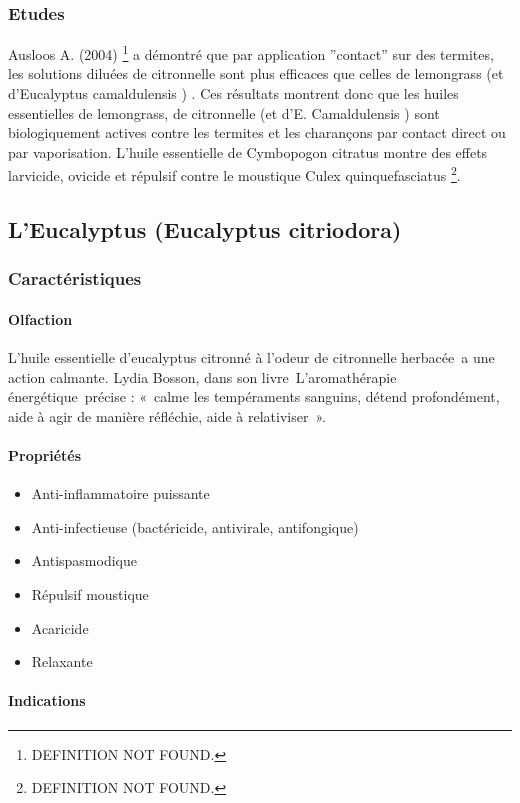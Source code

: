 \documentclass[12pt,a4wide]{article}
\begin{document}
\subsubsection{Etudes}
\label{sec-4-5-6}

Ausloos A. (2004) \footnote{DEFINITION NOT FOUND.} a démontré que par application ''contact'' sur des termites, les solutions diluées de citronnelle sont plus efficaces que celles de lemongrass (et  d'Eucalyptus camaldulensis ) . Ces résultats montrent donc que les huiles essentielles de lemongrass, de citronnelle (et d'E. Camaldulensis ) sont biologiquement actives contre les termites et les charançons par contact direct ou par vaporisation. 
L'huile essentielle de Cymbopogon citratus montre des effets larvicide, ovicide et répulsif contre le moustique Culex quinquefasciatus \footnote{DEFINITION NOT FOUND.}. 


\subsection{L'Eucalyptus (Eucalyptus citriodora)}
\label{sec-4-6}
\subsubsection{Caractéristiques}
\label{sec-4-6-1}
\paragraph{Olfaction}
\label{sec-4-6-1-1}
L'huile essentielle d'eucalyptus citronné à l'odeur de citronnelle herbacée a une action calmante.
Lydia Bosson, dans son livre L'aromathérapie énergétique précise : « calme les tempéraments sanguins, détend profondément, aide à agir de manière réfléchie, aide à relativiser ».
\paragraph{Propriétés}
\label{sec-4-6-1-2}
\begin{itemize}
\item Anti-inflammatoire puissante
\item Anti-infectieuse (bactéricide, antivirale, antifongique)
\item Antispasmodique
\item Répulsif moustique
\item Acaricide
\item Relaxante
\end{itemize}

\paragraph{Indications}
\label{sec-4-6-1-3}
\end{document}
